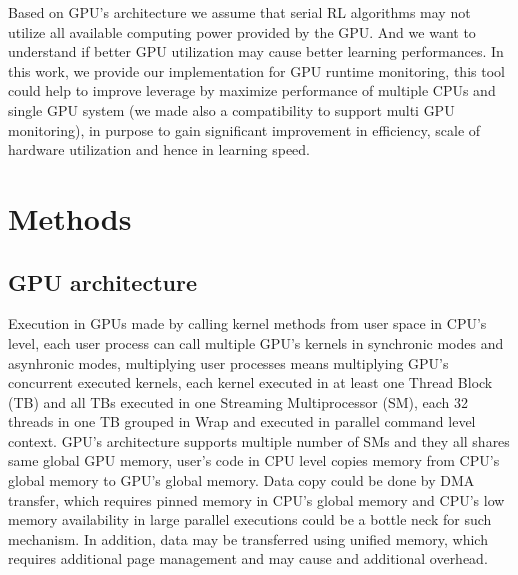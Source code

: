 \documentclass[11 pt, twocolumn]{article}
\begin{document}
Based on GPU's architecture we assume that serial RL algorithms may not utilize all available computing power provided by the GPU. And we want to understand if better GPU utilization may cause better learning performances.
In this work, we provide our implementation for GPU runtime monitoring, this tool could help to improve leverage by maximize performance of multiple CPUs and single GPU system (we made also a compatibility to support multi GPU monitoring), in purpose to gain significant improvement in efficiency, scale of hardware utilization and hence in learning speed.


\section{Methods}
\subsection{GPU architecture}
Execution in GPUs made by calling kernel methods from user space in CPU's level, each user process can call multiple GPU's kernels in synchronic modes and asynhronic modes, multiplying user processes means multiplying GPU's concurrent executed kernels, each kernel executed in at least one Thread Block (TB) and all TBs executed in one Streaming Multiprocessor (SM), each 32 threads in one TB grouped in Wrap and executed in parallel command level context. GPU's architecture supports multiple number of SMs and they all shares same global GPU memory, user's code in CPU level copies memory from CPU's global memory to GPU's global memory.
Data copy could be done by DMA transfer, which requires pinned memory in CPU's global memory and CPU's low memory availability in large parallel executions could be a bottle neck for such mechanism. In addition, data may be transferred using unified memory, which requires additional page management and may cause and additional overhead.
\end{document}
